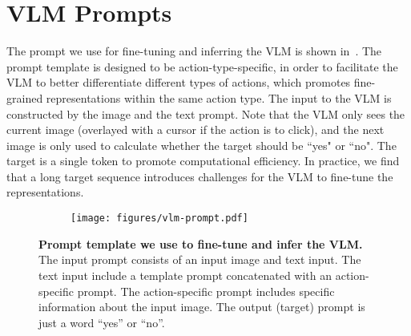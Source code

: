 
\section{VLM Prompts} \label{app:vlm-prompts}

The prompt we use for fine-tuning and inferring the VLM is shown in~. The prompt template is designed to be action-type-specific, in order to facilitate the VLM to better differentiate different types of actions, which promotes fine-grained representations within the same action type. The input to the VLM is constructed by the image and the text prompt. Note that the VLM only sees the current image (overlayed with a cursor if the action is to click), and the next image is only used to calculate whether the target should be ``yes" or ``no". The target is a single token to promote computational efficiency. In practice, we find that a long target sequence introduces challenges for the VLM to fine-tune the representations.

\begin{figure}[!htp]
     \centering
    \begin{subfigure}[b]{0.85\textwidth}
         \centering
    \texttt{[image: figures/vlm-prompt.pdf]}
     \end{subfigure}
     \vspace{2mm}
        \caption{\textbf{Prompt template we use to fine-tune and infer the VLM.} The input prompt consists of an input image and text input. The text input include a template prompt concatenated with an action-specific prompt. The action-specific prompt includes specific information about the input image. The output (target) prompt is just a word ``yes'' or ``no''.}
        \label{fig:vlm-prompt}
\end{figure}

